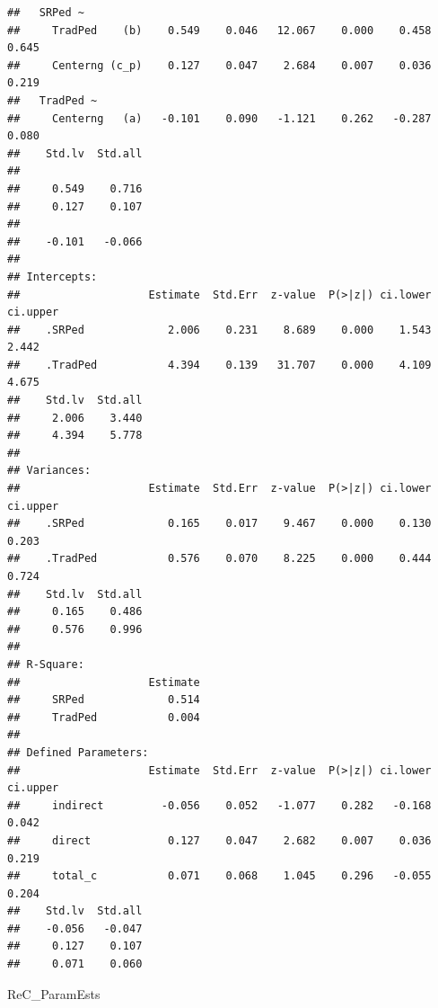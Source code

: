 \documentclass[
  11pt,
]{book}
\newenvironment{Shaded}{\begin{snugshade}}{\end{snugshade}}
\newcommand{\NormalTok}[1]{#1}
\begin{document}
\begin{verbatim}
##   SRPed ~                                                               
##     TradPed    (b)    0.549    0.046   12.067    0.000    0.458    0.645
##     Centerng (c_p)    0.127    0.047    2.684    0.007    0.036    0.219
##   TradPed ~                                                             
##     Centerng   (a)   -0.101    0.090   -1.121    0.262   -0.287    0.080
##    Std.lv  Std.all
##                   
##     0.549    0.716
##     0.127    0.107
##                   
##    -0.101   -0.066
## 
## Intercepts:
##                    Estimate  Std.Err  z-value  P(>|z|) ci.lower ci.upper
##    .SRPed             2.006    0.231    8.689    0.000    1.543    2.442
##    .TradPed           4.394    0.139   31.707    0.000    4.109    4.675
##    Std.lv  Std.all
##     2.006    3.440
##     4.394    5.778
## 
## Variances:
##                    Estimate  Std.Err  z-value  P(>|z|) ci.lower ci.upper
##    .SRPed             0.165    0.017    9.467    0.000    0.130    0.203
##    .TradPed           0.576    0.070    8.225    0.000    0.444    0.724
##    Std.lv  Std.all
##     0.165    0.486
##     0.576    0.996
## 
## R-Square:
##                    Estimate
##     SRPed             0.514
##     TradPed           0.004
## 
## Defined Parameters:
##                    Estimate  Std.Err  z-value  P(>|z|) ci.lower ci.upper
##     indirect         -0.056    0.052   -1.077    0.282   -0.168    0.042
##     direct            0.127    0.047    2.682    0.007    0.036    0.219
##     total_c           0.071    0.068    1.045    0.296   -0.055    0.204
##    Std.lv  Std.all
##    -0.056   -0.047
##     0.127    0.107
##     0.071    0.060
\end{verbatim}

\begin{Shaded}
\begin{Highlighting}[]
\NormalTok{ReC\_ParamEsts}
\end{Highlighting}
\end{Shaded}
\end{document}
